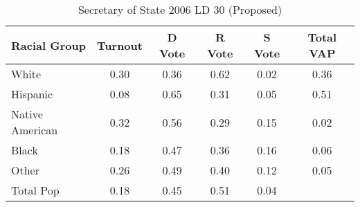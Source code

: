 \begin{table}[htb]
\begin{center}
\caption{Secretary of State 2006 LD 30 (Proposed)}
\label{sos06_vap_ld_30}
\begin{tabular}{lccccc}
  \hline
Racial Group & Turnout & D Vote & R Vote & S Vote & Total VAP \\ 
  \hline
White & 0.30 & 0.36 & 0.62 & 0.02 & 0.36 \\ 
  Hispanic & 0.08 & 0.65 & 0.31 & 0.05 & 0.51 \\ 
  Native American & 0.32 & 0.56 & 0.29 & 0.15 & 0.02 \\ 
  Black & 0.18 & 0.47 & 0.36 & 0.16 & 0.06 \\ 
  Other & 0.26 & 0.49 & 0.40 & 0.12 & 0.05 \\ 
  Total Pop & 0.18 & 0.45 & 0.51 & 0.04 &  \\ 
   \hline
\end{tabular}
\end{center}
\end{table}
